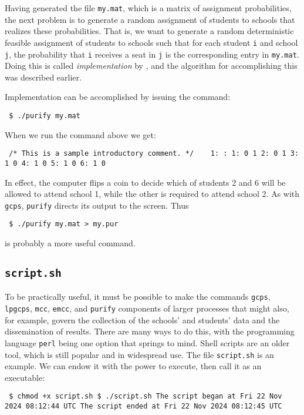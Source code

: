 \documentclass[12pt]{article}
\theoremstyle{definition}
\begin{document}
Having generated the file \texttt{my.mat}, which is a matrix of
assignment probabilities, the next problem is to generate a random
assignment of students to schools that realizes these probabilities.
That is, we want to generate a random deterministic feasible
assignment of students to schools such that for each student
\texttt{i} and school \texttt{j}, the probability that \texttt{i}
receives a seat in \texttt{j} is the corresponding entry in
\texttt{my.mat}.  Doing this is called \emph{implementation} by
\cite{bckm13aer}, and the algorithm for accomplishing this was
described earlier.

Implementation can be accomplished by issuing the command:
\begin{obeylines}
  \texttt{
    \$ ./purify my.mat 
    }
\end{obeylines}
\bigskip \noindent When we run the command above we get:
\begin{obeylines}\texttt{
/* This is a sample introductory comment. */
    \ \ \      1: \!\!\!\!:
   1:    0    1
   2:    0    1
   3:    1    0
   4:    1    0
   5:    1    0
   6:    1    0
}
\end{obeylines} \noindent
In effect, the computer flips a coin to decide which of students 2 and
6 will be allowed to attend school 1, while the other is required to
attend school 2.  As with \texttt{gcps}, \texttt{purify} directs its
output to the screen.  Thus
\begin{obeylines}
  \texttt{
    \$ ./purify my.mat > my.pur
    }
\end{obeylines}
\bigskip \noindent
is probably a more useful command.

\subsection{\texttt{script.sh}}

To be practically useful, it must be possible to make the commands
\texttt{gcps}, \texttt{lpgcps}, \texttt{mcc}, \texttt{emcc}, and
\texttt{purify} components of larger processes that might also, for
example, govern the collection of the schools' and students' data and
the dissemination of results.  There are many ways to do this, with
the programming language \texttt{perl} being one option that springs
to mind.  Shell scripts are an older tool, which is still popular and
in widespread use.  The file \texttt{script.sh} is an example.  We can
endow it with the power to execute, then call it as an executable:
\begin{obeylines}
  \texttt{
    \$ chmod +x script.sh
    \$ ./script.sh
The script began at 
Fri 22 Nov 2024 08:12:44 UTC
The script ended at 
Fri 22 Nov 2024 08:12:45 UTC
    }
\end{obeylines}
\bigskip
\end{document}
